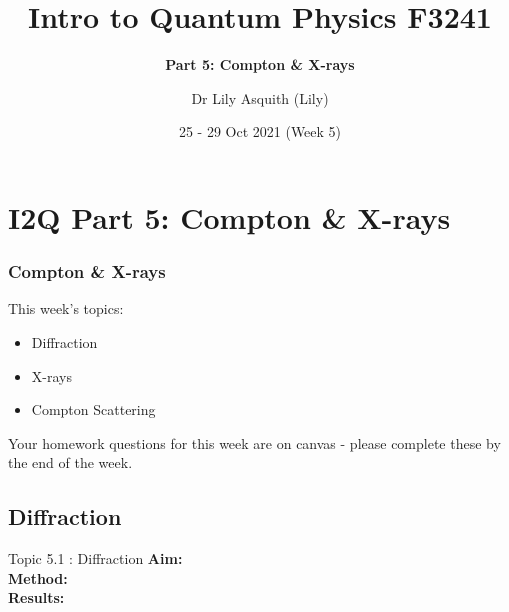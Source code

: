 


% 
\title[ Intro to Quantum Physics]{Intro to Quantum Physics F3241}
\subtitle{\textbf{Part 5: Compton \& X-rays}}
\author[Dr Lily Asquith (Lily)]{ Dr Lily Asquith (Lily)}
\date[25 - 29 Oct 2021]{ 25 - 29 Oct 2021 (Week 5)}





\begin{frame}
\titlepage
\end{frame} 

\section{I2Q Part 5: Compton \& X-rays}
\begin{frame}
\frametitle{Compton \& X-rays} 
\normalsize

This week's topics:\\[3ex]

\begin{itemize}
\item[5.1] Diffraction\\[3ex]
\item[5.2] X-rays\\[3ex]
\item[5.3] Compton Scattering\\[3ex]
\end{itemize}

Your homework questions for this week are on canvas - please complete these by the end of the week.
\end{frame} 
 
 
 \subsection{Diffraction}

\begin{frame}{Topic 5.1 : Diffraction}
\small
\textbf{Aim:}\\
\textbf{Method:}\\
\textbf{Results:}\\
\end{frame}


